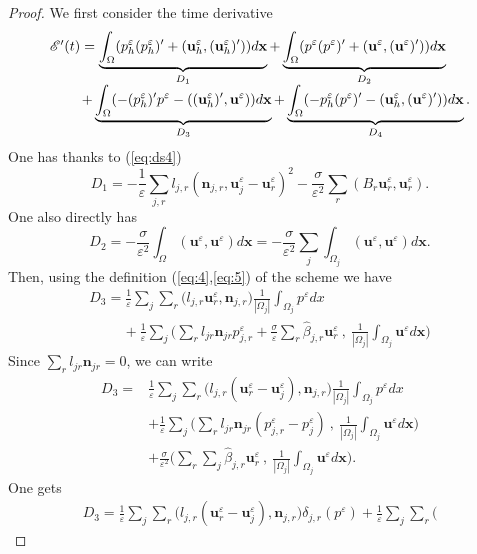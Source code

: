 \documentclass[a4paper,french,english,10pt]{article}
\newcommand\uu{\mathbf{u}}
\newcommand\eps{\varepsilon}
\newcommand\x{\mathbf{x}}
\begin{document}
\begin{proof}
We first consider  the time  derivative
\begin{equation*} \label{eq:eetoile}
\begin{array}{l}
\mathscr{E}'(t)
=\underbrace{\int_{\Omega}(p_h^{\eps}(p_h^{\eps})'+(\uu_h^{\eps},(\textbf{u}
_h^{\eps})'))d\x}_{D_1}+ \underbrace{
\int_{\Omega}(p^{\eps}(p^{\eps})'+(\textbf{u}^{\eps},(\textbf{u}^{\eps})'))d\x}_{
D_2} \\
\hspace{0.8cm}+ \underbrace{\int_{\Omega}
(-(p_h^{\eps})'p^{\eps}-((\textbf{u}_h^{\eps})',\textbf{u}^{\eps}))d\x}_{D_3} 
+ \underbrace{\int_{\Omega}
(-p_h^{\eps}(p^{\eps})'-(\textbf{u}_h^{\eps},(\textbf{u}^{\eps})'))d\x}_{D_4}.
\end{array}
\end{equation*}
One has thanks to  (\ref{eq:ds4})
$$
D_1
=-\frac{1}{\eps}\sum_{j,r}l_{j,r}(\textbf{n}_{j,r},\textbf{u}_j^{\eps}-\textbf{u}
_r^{\eps})^2-\frac{\sigma}{\eps^2}\sum_{r}
( B_r\textbf{u}_r^{\eps},\textbf{u}_r^{\eps}).
$$
One also directly has
\begin{equation*}
D_2 =
-\frac{\sigma}{\eps^2}\int_{\Omega}(\uu^{\eps},\uu^{\eps})d\x =
-\frac{\sigma}{\eps^2}\sum_j\int_{\Omega_j}(\uu^{\eps},\uu^{\eps}
)d\x.
\end{equation*}
Then,  using the  definition (\ref{eq:4},\ref{eq:5}) of the scheme we have
\begin{equation*}
\begin{array}{l}
D_3 = \frac{1}{\eps} \sum_j \sum_r \bigg(
l_{j,r}\textbf{u}_r^{\eps},\textbf{n}_{j,r} \bigg) 
\frac{1}{|\Omega_j|}\int_{\Omega_j} p^{\eps} dx \\
\hspace{1cm}+\frac{1}{\eps} \sum_j \bigg( \sum_r
l_{jr} \mathbf n_{jr} p_{j,r}^{\eps}+\frac{\sigma}{\eps} \sum_r
\widehat{\beta}_{j,r}\textbf{u}_r^{\eps}  \: , \:
\frac{1}{|\Omega_j|}\int_{\Omega_j} \uu^{\eps} d\x \bigg) 
\end{array}
\end{equation*}
Since $\sum_r l_{jr} \mathbf n_{jr}=0$,  we can write
\begin{equation*}
\begin{array}{ll}
D_3= &  \frac{1}{\eps} \sum_j \sum_r \bigg(
l_{j,r}(\textbf{u}_r^{\eps}-\textbf{u}_j^{\eps}),\textbf{n}_{j,r} \bigg) 
\frac{1}{|\Omega_j|}\int_{\Omega_j} p^{\eps} dx \\
& + \frac{1}{\eps} \sum_j \bigg( \sum_r 
l_{jr} \mathbf n_{jr} (p_{j,r}^{\eps}
-
p_j^{\eps})  \: , \: \frac{1}{|\Omega_j|}\int_{\Omega_j}
\uu^{\eps} d\x \bigg) \\
& +\frac{\sigma}{\eps^2} \bigg( \sum_r \sum_j\widehat{\beta}_{j,r}\textbf{u}_r^{\eps} 
\: , \: \frac{1}{|\Omega_j|}\int_{\Omega_j} \uu^{\eps} d\x \bigg) .
\end{array}
\end{equation*}
One gets
\begin{equation*}
\begin{array}{l}
D_3 =\frac{1}{\eps} \sum_j \sum_r \bigg(
l_{j,r}(\textbf{u}_r^{\eps}-\textbf{u}_j^{\eps}),\textbf{n}_{j,r} \bigg)
\delta_{j,r}(p^{\eps})+\frac{1}{\eps} \sum_j \sum_r \bigg( 


\end{array}
\end{equation*}
\end{proof}
\end{document}
